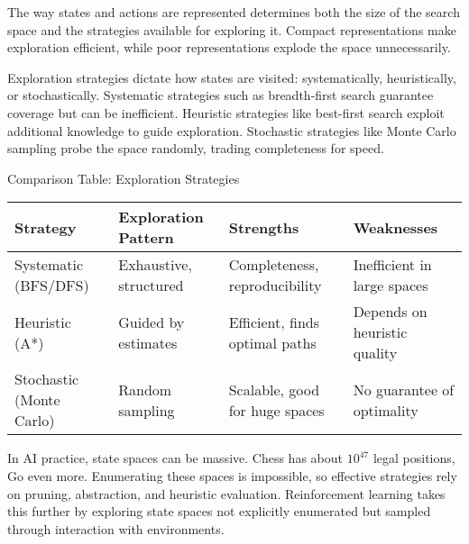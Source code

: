 \documentclass[
  letterpaper,
  DIV=11,
  numbers=noendperiod]{scrreprt}
\begin{document}
The way states and actions are represented determines both the size of
the search space and the strategies available for exploring it. Compact
representations make exploration efficient, while poor representations
explode the space unnecessarily.

Exploration strategies dictate how states are visited: systematically,
heuristically, or stochastically. Systematic strategies such as
breadth-first search guarantee coverage but can be inefficient.
Heuristic strategies like best-first search exploit additional knowledge
to guide exploration. Stochastic strategies like Monte Carlo sampling
probe the space randomly, trading completeness for speed.

Comparison Table: Exploration Strategies

\begin{longtable}[]{@{}
  >{\raggedright\arraybackslash}p{}
  >{\raggedright\arraybackslash}p{}
  >{\raggedright\arraybackslash}p{}
  >{\raggedright\arraybackslash}p{}@{}}
\toprule\noalign{}
\begin{minipage}[b]{\linewidth}\raggedright
Strategy
\end{minipage} & \begin{minipage}[b]{\linewidth}\raggedright
Exploration Pattern
\end{minipage} & \begin{minipage}[b]{\linewidth}\raggedright
Strengths
\end{minipage} & \begin{minipage}[b]{\linewidth}\raggedright
Weaknesses
\end{minipage} \\
\midrule\noalign{}
\endhead
\bottomrule\noalign{}
\endlastfoot
Systematic (BFS/DFS) & Exhaustive, structured & Completeness,
reproducibility & Inefficient in large spaces \\
Heuristic (A*) & Guided by estimates & Efficient, finds optimal paths &
Depends on heuristic quality \\
Stochastic (Monte Carlo) & Random sampling & Scalable, good for huge
spaces & No guarantee of optimality \\
\end{longtable}

In AI practice, state spaces can be massive. Chess has about \(10^{47}\)
legal positions, Go even more. Enumerating these spaces is impossible,
so effective strategies rely on pruning, abstraction, and heuristic
evaluation. Reinforcement learning takes this further by exploring state
spaces not explicitly enumerated but sampled through interaction with
environments.
\end{document}
